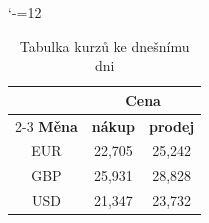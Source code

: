 \documentclass [11pt, a4paper] {article}
\begin{document}
        \medskip
        \begin{table}[h]
            \begin{center}
                \catcode`-=12
                \begin{tabular}{| c | c | c |}   \hline
                                        & \multicolumn{2}{c|}{\textbf{Cena}}                \\ \cline{2-3} 
                    \textbf{Měna}       & \textbf{nákup}     & \textbf{prodej}              \\ \hline
                                EUR     & 22,705    & 25,242                                \\ 
                                GBP     & 25,931    & 28,828                                \\ 
                                USD     &  21,347   & 23,732                                \\ \hline
                        
                \end{tabular}
                \caption{Tabulka kurzů ke dnešnímu dni}
                \label{Kurzy}
            \end{center}
            
        \end{table}

        \bigskip
\end{document}
